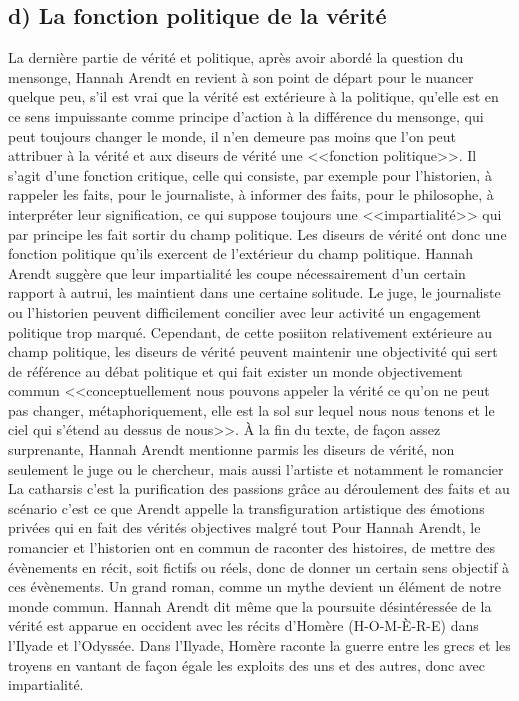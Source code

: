 \documentclass[12pt]{article}
\begin{document}
\subsection*{d) La fonction politique de la vérité}
La dernière partie de vérité et politique, après avoir abordé la question du mensonge, Hannah Arendt en revient à son point de départ pour le nuancer quelque peu, s'il est vrai que la vérité est extérieure à la politique, qu'elle est en ce sens impuissante comme principe d'action à la différence du mensonge, qui peut toujours changer le monde, il n'en demeure pas moins que l'on peut attribuer à la vérité et aux diseurs de vérité une <<fonction politique>>. Il s'agit d'une fonction critique, celle qui consiste, par exemple pour l'historien, à rappeler les faits, pour le journaliste, à informer des faits, pour le philosophe, à interpréter leur signification, ce qui suppose toujours une <<impartialité>> qui par principe les fait sortir du champ politique.
Les diseurs de vérité ont donc une fonction politique qu'ils exercent de l'extérieur du champ politique.
Hannah Arendt suggère que leur impartialité les coupe nécessairement d'un certain rapport à autrui, les maintient dans une certaine solitude.
Le juge, le journaliste ou l'historien peuvent difficilement concilier avec leur activité un engagement politique trop marqué.
Cependant, de cette posiiton relativement extérieure au champ politique, les diseurs de vérité peuvent maintenir une objectivité qui sert de référence au débat politique et qui fait exister un monde objectivement commun <<conceptuellement nous pouvons appeler la vérité ce qu'on ne peut pas changer, métaphoriquement, elle est la sol sur lequel nous nous tenons et le ciel qui s'étend au dessus de nous>>.
À la fin du texte, de façon assez surprenante, Hannah Arendt mentionne parmis les diseurs de vérité, non seulement le juge ou le chercheur, mais aussi l'artiste et notamment le romancier
La catharsis c'est la purification des passions grâce au déroulement des faits et au scénario c'est ce que Arendt appelle la transfiguration artistique des émotions privées qui en fait des vérités objectives malgré tout
Pour Hannah Arendt, le romancier et l'historien ont en commun de raconter des histoires, de mettre des évènements en récit, soit fictifs ou réels, donc de donner un certain sens objectif à ces évènements.
Un grand roman, comme un mythe devient un élément de notre monde commun.
Hannah Arendt dit même que la poursuite désintéressée de la vérité est apparue en occident avec les récits d'Homère (H-O-M-È-R-E) dans l'Ilyade et l'Odyssée.
Dans l'Ilyade, Homère raconte la guerre entre les grecs et les troyens en vantant de façon égale les exploits des uns et des autres, donc avec impartialité.
\end{document}
